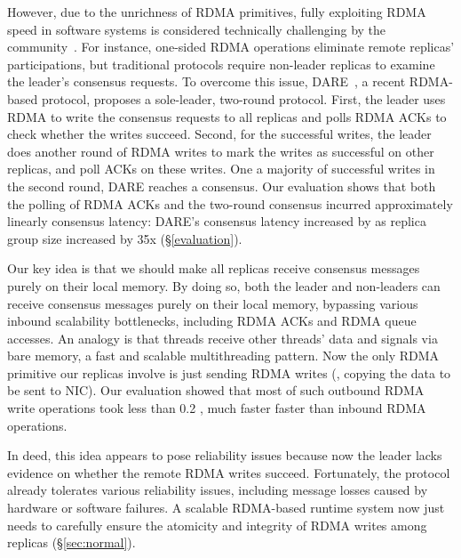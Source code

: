 However, due to the unrichness of RDMA primitives, fully exploiting RDMA
speed in software systems is considered technically challenging by the
community~\cite{pilaf:usenix14,herd:sigcomm14,dare:hpdc15,farm:sosp15}. For
instance, one-sided RDMA operations eliminate remote replicas' participations,
but traditional \paxos protocols require non-leader replicas to examine the
leader's consensus requests. To overcome this issue, DARE~\cite{dare:hpdc15}, a
recent RDMA-based \paxos protocol, proposes a sole-leader, two-round protocol.
First, the leader uses RDMA to write the consensus requests to all replicas and
polls RDMA ACKs to check whether the writes succeed. Second, for the successful
writes, the leader does another round of RDMA writes to mark the writes as
successful on other replicas, and poll ACKs on these writes. One a majority of
successful writes in the second round, DARE reaches a consensus. Our evaluation
shows that both the polling of RDMA ACKs and the two-round consensus incurred
approximately linearly consensus latency: DARE's consensus latency increased by
\darescalability as replica group size increased by 35x (\S\ref{evaluation}).

Our key idea is that we should make all \paxos replicas receive consensus
messages purely on their local memory. By doing so, both the leader and
non-leaders can receive consensus messages purely on their local memory,
bypassing various inbound scalability bottlenecks, including RDMA ACKs and RDMA
queue accesses. An analogy is that threads receive other threads' data and
signals via bare memory, a fast and scalable multithreading pattern. Now the
only RDMA primitive our \paxos replicas involve is just sending RDMA writes
(\ie, copying the data to be sent to NIC). Our evaluation showed that
most of such outbound RDMA write operations took less than 0.2 \us, much faster
faster than inbound RDMA operations.

In deed, this idea appears to pose reliability issues because now the leader
lacks evidence on whether the remote RDMA writes succeed. Fortunately, the
\paxos protocol already tolerates various reliability issues, including message
losses caused by hardware or software failures. A scalable RDMA-based \paxos
runtime system now just needs to carefully ensure the atomicity and integrity
of RDMA writes among replicas (\S\ref{sec:normal}).



